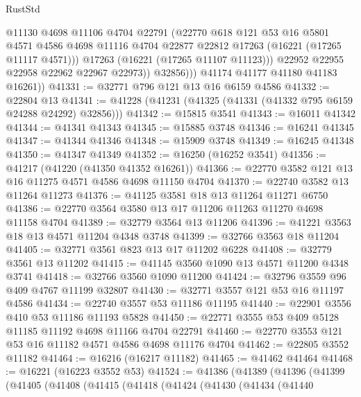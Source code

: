 \begin{lexlean}{RustStd}
\begin{coremodule}
                    @11130
                    @4698
                    @11106
                    @4704
                    @22791
                    (@22770
                      @618
                      @121
                      @53
                      @16
                      @5801
                      @4571
                      @4586
                      @4698
                      @11116
                      @4704
                      @22877
                      @22812
                      @17263
                      (@16221 (@17265 @11117 @4571)))
                    @17263
                    (@16221 (@17265 @11107 @11123)))
                  @22952
                  @22955
                  @22958
                  @22962
                  @22967
                  @22973))
              @32856)))
        @41174
        @41177
        @41180
        @41183
        @16261))
@41331 := @32771 @796 @121 @13 @16 @6159 @4586
@41332 := @22804 @13
@41341 := @41228 (@41231 (@41325 (@41331 (@41332 @795 @6159 @24288 @24292) @32856)))
@41342 := @15815 @3541
@41343 := @16011 @41342
@41344 := @41341 @41343
@41345 := @15885 @3748
@41346 := @16241 @41345
@41347 := @41344 @41346
@41348 := @15909 @3748
@41349 := @16245 @41348
@41350 := @41347 @41349
@41352 := @16250 (@16252 @3541)
@41356 := @41217 (@41220 (@41350 @41352 @16261))
@41366 := @22770 @3582 @121 @13 @16 @11275 @4571 @4586 @4698 @11150 @4704
@41370 := @22740 @3582 @13 @11264 @11273
@41376 := @41125 @3581 @18 @13 @11264 @11271 @6750
@41386 := @22770 @3564 @3580 @13 @17 @11206 @11263 @11270 @4698 @11158 @4704
@41389 := @32779 @3564 @13 @11206
@41396 := @41221 @3563 @18 @13 @4571 @11204 @4348 @3748
@41399 := @32766 @3563 @18 @11204
@41405 := @32771 @3561 @823 @13 @17 @11202 @6228
@41408 := @32779 @3561 @13 @11202
@41415 := @41145 @3560 @1090 @13 @4571 @11200 @4348 @3741
@41418 := @32766 @3560 @1090 @11200
@41424 := @32796 @3559 @96 @409 @4767 @11199 @32807
@41430 := @32771 @3557 @121 @53 @16 @11197 @4586
@41434 := @22740 @3557 @53 @11186 @11195
@41440 := @22901 @3556 @410 @53 @11186 @11193 @5828
@41450 := @22771 @3555 @53 @409 @5128 @11185 @11192 @4698 @11166 @4704 @22791
@41460 := @22770 @3553 @121 @53 @16 @11182 @4571 @4586 @4698 @11176 @4704
@41462 := @22805 @3552 @11182
@41464 := @16216 (@16217 @11182)
@41465 := @41462 @41464
@41468 := @16221 (@16223 @3552 @53)
@41524 := @41386
    (@41389
      (@41396
        (@41399
          (@41405
            (@41408
              (@41415
                (@41418
                  (@41424
                    (@41430
                      (@41434
                        (@41440

\end{coremodule}
\end{lexlean}
